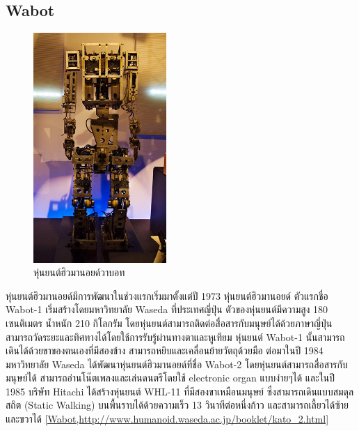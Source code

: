 \subsection*{Wabot}
\begin{figure}[ht]
    \centering
    \includegraphics[width=0.45\textwidth]{chapter2/images/wabot.jpg}
    \caption{หุ่นยนต์ฮิวมานอยด์วาบอท}
    \label{fig:wabot_humanoid}
\end{figure}
หุ่นยนต์ฮิวมานอยด์มีการพัฒนาในช่วงแรกเริ่มมาตั้งแต่ปี 1973 หุ่นยนต์ฮิวมานอยด์ ตัวแรกชื่อ Wabot-1 เริ่มสร้างโดยมหาวิทยาลัย Waseda ที่ประเทศญี่ปุ่น ตัวของหุ่นยนต์มีความสูง 180 เซนติเมตร
น้ำหนัก 210 กิโลกรัม โดยหุ่นยนต์สามารถติดต่อสื่อสารกับมนุษย์ได้ด้วยภาษาญี่ปุ่น สามารถวัดระยะและทิศทางได้โดยใช้การรับรู้ผ่านทางตาและหูเทียม หุ่นยนต์ Wabot-1 นั้นสามารถเดินได้ด้วยขาของตนเองที่มีสองข้าง
สามารถหยิบและเคลื่อนย้ายวัตถุด้วยมือ ต่อมาในปี 1984 มหาวิทยาลัย Waseda ได้พัฒนาหุ่นยนต์ฮิวมานอยด์ที่ชื่อ Wabot-2 โดยหุ่นยนต์สามารถสื่อสารกับมนุษย์ได้ สามารถอ่านโน๊ตเพลงและเล่นดนตรีโดยใช้ electronic organ แบบง่ายๆได้
และในปี 1985 บริษัท Hitachi ได้สร้างหุ่นยนต์ WHL-11 ที่มีสองขาเหมือนมนุษย์ ซึ่งสามารถเดินแบบสมดุลสถิต (Static Walking) บนพื้นราบได้ด้วยความเร็ว 13 วินาทีต่อหนึ่งก้าว และสามารถเลี้ยวได้ซ้ายและขวาได้
\ref{Wabot,http://www.humanoid.waseda.ac.jp/booklet/kato_2.html}